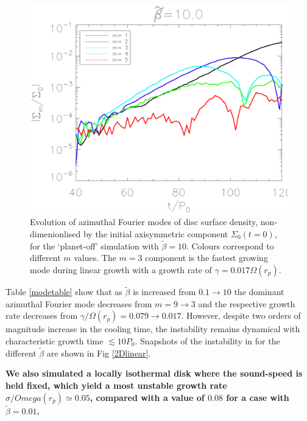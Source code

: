 \begin{figure}
  \includegraphics[width=\linewidth,clip=true,trim=1.2cm
  0cm 0cm 0cm]{figures/linear_stability}
  \caption{Evolution of azimuthal Fourier modes of disc surface
    density, non-dimenionlised by the initial axisymmetric component 
    $\Sigma_0(t=0)$, for the
    `planet-off' simulation with $\tilde{\beta}=10$. Colours correspond
    to different $m$ values. The $m=3$ component is the fastest growing
    mode during linear growth with a growth rate of 
    $\gamma=0.017\Omega(r_p)$.\label{linearmodes}}
\end{figure}


Table \ref{modetable} show that as
$\tilde{\beta}$ is increased from $ 0.1\rightarrow10$ the dominant
azimuthal Fourier mode decreases from $ m=9\rightarrow3$ and the
respective growth rate decreases from $ \gamma/\Omega(r_p)=0.079
\rightarrow 0.017$. However, despite two orders of magnitude increase in the
cooling time, the instability remains dynamical with characteristic  growth time
$\lesssim 10P_0$. Snapshots of the instability in for  
the different $\tilde\beta$ are shown in Fig \ref{2Dlinear}. 

{\bf We also simulated a locally isothermal disk where the sound-speed is
  held fixed, which yield a most unstable growth rate
  $\sigma/Omega(r_p)\simeq 0.05$, compared with a value of $0.08$ for
  a case with $\tilde{\beta}=0.01$.}   

